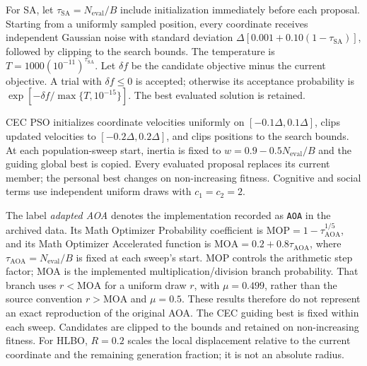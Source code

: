 \documentclass[pdflatex,onecolumn,sn-mathphys-num]{sn-jnl}
\begin{document}
For SA, let $\tau_{\mathrm{SA}}=N_{\mathrm{eval}}/B$ include initialization immediately before each proposal. Starting from a uniformly sampled position, every coordinate receives independent Gaussian noise with standard deviation $\Delta[0.001+0.10(1-\tau_{\mathrm{SA}})]$, followed by clipping to the search bounds. The temperature is $T=1000(10^{-11})^{\tau_{\mathrm{SA}}}$. Let $\delta f$ be the candidate objective minus the current objective. A trial with $\delta f\leq0$ is accepted; otherwise its acceptance probability is $\exp[-\delta f/\max\{T,10^{-15}\}]$. The best evaluated solution is retained.

CEC PSO initializes coordinate velocities uniformly on $[-0.1\Delta,0.1\Delta]$, clips updated velocities to $[-0.2\Delta,0.2\Delta]$, and clips positions to the search bounds. At each population-sweep start, inertia is fixed to $w=0.9-0.5N_{\mathrm{eval}}/B$ and the guiding global best is copied. Every evaluated proposal replaces its current member; the personal best changes on non-increasing fitness. Cognitive and social terms use independent uniform draws with $c_1=c_2=2$.

The label \emph{adapted AOA} denotes the implementation recorded as \texttt{AOA} in the archived data. Its Math Optimizer Probability coefficient is $\mathrm{MOP}=1-\tau_{\mathrm{AOA}}^{1/5}$, and its Math Optimizer Accelerated function is $\mathrm{MOA}=0.2+0.8\tau_{\mathrm{AOA}}$, where $\tau_{\mathrm{AOA}}=N_{\mathrm{eval}}/B$ is fixed at each sweep's start. MOP controls the arithmetic step factor; MOA is the implemented multiplication/division branch probability. That branch uses $r<\mathrm{MOA}$ for a uniform draw $r$, with $\mu=0.499$, rather than the source convention $r>\mathrm{MOA}$ and $\mu=0.5$. These results therefore do not represent an exact reproduction of the original AOA. The CEC guiding best is fixed within each sweep. Candidates are clipped to the bounds and retained on non-increasing fitness. For HLBO, $R=0.2$ scales the local displacement relative to the current coordinate and the remaining generation fraction; it is not an absolute radius.
\end{document}
